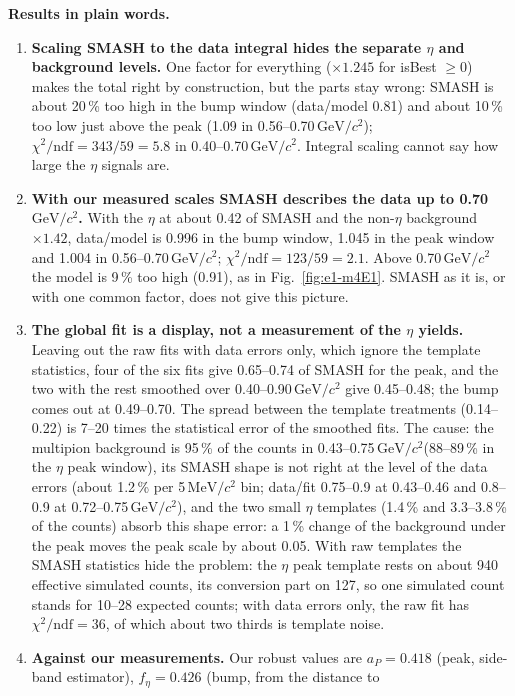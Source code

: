 \documentclass[11pt,a4paper]{article}
\newcommand{\GeVcc}{\ensuremath{\mathrm{GeV}/c^{2}}\xspace}
\newcommand{\MeVcc}{\ensuremath{\mathrm{MeV}/c^{2}}\xspace}
\newcommand{\aP}{\ensuremath{a_P}\xspace}
\newcommand{\feta}{\ensuremath{f_\eta}\xspace}
\begin{document}
\textbf{Results in plain words.}
\begin{enumerate}\setlength{\itemsep}{1pt}
\item \textbf{Scaling SMASH to the data integral hides the separate $\eta$ and background levels.} One factor for everything ($\times1.245$ for
      isBest $\ge0$) makes the total right by construction, but the parts stay wrong: SMASH is about 20\,\% too high in the bump window
      (data/model 0.81) and about 10\,\% too low just above the peak (1.09 in 0.56--0.70\,\GeVcc); $\chi^2/\mathrm{ndf}=343/59=5.8$ in
      0.40--0.70\,\GeVcc. Integral scaling cannot say how large the $\eta$ signals are.
\item \textbf{With our measured scales SMASH describes the data up to 0.70\,\GeVcc.} With the $\eta$ at about 0.42 of SMASH and the non-$\eta$
      background $\times1.42$, data/model is 0.996 in the bump window, 1.045 in the peak window and 1.004 in 0.56--0.70\,\GeVcc;
      $\chi^2/\mathrm{ndf}=123/59=2.1$. Above 0.70\,\GeVcc the model is 9\,\% too high (0.91), as in Fig.~\ref{fig:e1-m4E1}. SMASH as it is,
      or with one common factor, does not give this picture.
\item \textbf{The global fit is a display, not a measurement of the $\eta$ yields.} Leaving out the raw fits with data errors only, which ignore the
      template statistics, four of the six fits give 0.65--0.74 of SMASH for the peak, and the two with the rest smoothed over 0.40--0.90\,\GeVcc
      give 0.45--0.48; the bump comes out at 0.49--0.70. The spread between
      the template treatments (0.14--0.22) is 7--20 times the statistical error of the smoothed fits. The cause: the multipion background is 95\,\% of
      the counts in 0.43--0.75\,\GeVcc (88--89\,\% in the $\eta$ peak window), its SMASH shape is not right at the level of the data errors (about
      1.2\,\% per 5\,\MeVcc bin; data/fit 0.75--0.9 at 0.43--0.46 and 0.8--0.9 at 0.72--0.75\,\GeVcc), and the two small $\eta$ templates (1.4\,\%
      and 3.3--3.8\,\% of the counts) absorb this shape error: a 1\,\% change of the background under the peak moves the peak scale by about 0.05.
      With raw templates the SMASH statistics hide the problem: the $\eta$ peak template rests on about 940 effective simulated counts, its conversion
      part on 127, so one simulated count stands for 10--28 expected counts; with data errors only, the raw fit has $\chi^2/\mathrm{ndf}=36$, of
      which about two thirds is template noise.
\item \textbf{Against our measurements.} Our robust values are $\aP=0.418$ (peak, side-band estimator), $\feta=0.426$ (bump, from the distance to

\end{enumerate}
\end{document}
